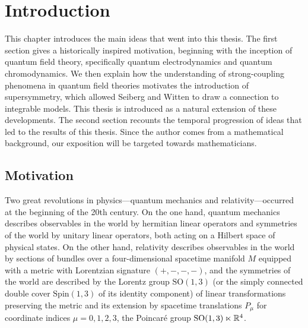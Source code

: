
%
%

\chapter{Introduction}\label{chap:intro}%
%

\begin{chapterabstract}
	This chapter introduces the main ideas that went into this thesis. The first section gives a historically inspired motivation, beginning with the inception of quantum field theory, specifically quantum electrodynamics and quantum chromodynamics. We then explain how the understanding of strong-coupling phenomena in quantum field theories motivates the introduction of supersymmetry, which allowed Seiberg and Witten to draw a connection to integrable models. This thesis is introduced as a natural extension of these developments. The second section recounts the temporal progression of ideas that led to the results of this thesis. Since the author comes from a mathematical background, our exposition will be targeted towards mathematicians.
\end{chapterabstract}


\section{Motivation}\label{sec:motivation}

Two great revolutions in physics---quantum mechanics and relativity---occurred at the beginning of the 20th century. On the one hand, quantum mechanics describes observables in the world by hermitian linear operators and symmetries of the world by unitary linear operators, both acting on a Hilbert space of physical states. On the other hand, relativity describes observables in the world by sections of bundles over a four-dimensional spacetime manifold $M$ equipped with a metric with Lorentzian signature $(+,-,-,-)$, and the symmetries of the world are described by the Lorentz group $\mathrm{SO}(1,3)$ (or the simply connected double cover $\mathrm{Spin}(1,3)$ of its identity component) of linear transformations preserving the metric and its extension by spacetime translations $P_\mu$ for coordinate indices $\mu=0,1,2,3$, the Poincaré group $\mathrm{SO}(1,3) \ltimes \mathbb{R}^4$.

